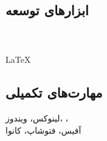 \documentclass[a4paper]{deedy-persian} %
\begin{document}
\begin{minipage}[t]{0.33\textwidth}
\subsection*{ابزارهای توسعه}
 \\
 \\
\LaTeX \\

\subsection*{مهارت‌های تکمیلی}
لینوکس، ویندوز، ،  \\
آفیس، فتوشاپ، کانوا \\

\end{minipage} %
\newpage
\end{document}
